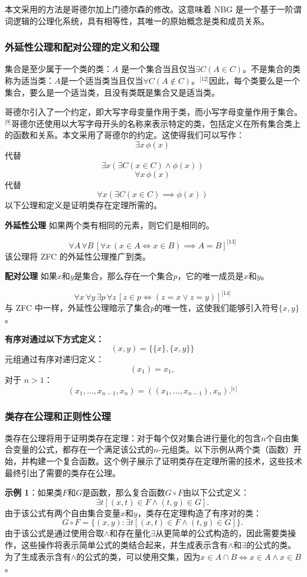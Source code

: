 本文采用的方法是哥德尔加上门德尔森的修改。这意味着 NBG 是一个基于一阶谓词逻辑的公理化系统，具有相等性，其唯一的原始概念是类和成员关系。
\subsubsection{外延性公理和配对公理的定义和公理} 
集合是至少属于一个类的类：\( A \) 是一个集合当且仅当\( \exists C (A \in C) \)。不是集合的类称为适当类：\( A \)是一个适当类当且仅当\( \forall C (A \notin C) \)。\(^\text{[12]}\)因此，每个类要么是一个集合，要么是一个适当类，且没有类既是集合又是适当类。

哥德尔引入了一个约定，即大写字母变量作用于类，而小写字母变量作用于集合。\(^\text{[9]}\)哥德尔还使用以大写字母开头的名称来表示特定的类，包括定义在所有集合类上的函数和关系。本文采用了哥德尔的约定。这使得我们可以写作：
\[
\exists x \, \phi(x)~
\]
代替  
\[
\exists x \left( \exists C (x \in C) \land \phi(x) \right)~
\]
\[
\forall x \, \phi(x)~
\]
代替  
\[
\forall x \left( \exists C (x \in C) \implies \phi(x) \right)~
\]
以下公理和定义是证明类存在定理所需的。

\textbf{外延性公理} 
如果两个类有相同的元素，则它们是相同的。

\[
\forall A \, \forall B \, \left[ \forall x \, (x \in A \iff x \in B) \implies A = B \right]^\text{[13]}~
\] 
该公理将 ZFC 的外延性公理推广到类。

\textbf{配对公理} 
如果\( x \)和\( y \)是集合，那么存在一个集合\( p \)，它的唯一成员是\( x \)和\( y \)。

\[
\forall x \, \forall y \, \exists p \, \forall z \, \left[ z \in p \iff (z = x \lor z = y) \right]^\text{[14]}~
\]
与 ZFC 中一样，外延性公理暗示了集合\( p \)的唯一性，这使我们能够引入符号\( \{x, y\} \)。

\textbf{有序对通过以下方式定义：}
\[
(x, y) = \{\{x\}, \{x, y\}\}~
\]
元组通过有序对递归定义：
\[
(x_1) = x_1,~
\]
对于 \( n > 1 \)：
\[
(x_1, \ldots, x_{n-1}, x_n) = ((x_1, \ldots, x_{n-1}), x_n).^\text{[c]}~
\]  
\subsubsection{类存在公理和正则性公理}  
类存在公理将用于证明类存在定理：对于每个仅对集合进行量化的包含\( n \)个自由集合变量的公式，都存在一个满足该公式的\( n \)-元组类。以下示例从两个类（函数）开始，并构建一个复合函数。这个例子展示了证明类存在定理所需的技术，这些技术最终引出了需要的类存在公理。

\textbf{示例 1}：如果类\( F \)和\( G \)是函数，那么复合函数\( G \circ F \)由以下公式定义：
\[
\exists t \left[ (x,t) \in F \land (t,y) \in G \right].~
\]
由于该公式有两个自由集合变量\( x \)和\( y \)，类存在定理构造了有序对的类：
\[
G \circ F = \{ (x,y) : \exists t \left[ (x,t) \in F \land (t,y) \in G \right] \}.~
\]
由于该公式是通过使用合取\( \land \)和存在量化\( \exists \)从更简单的公式构造的，因此需要类操作，这些操作将表示简单公式的类结合起来，并生成表示含有\( \land \)和\( \exists \)的公式的类。为了生成表示含有\( \land \)的公式的类，可以使用交集，因为\( x \in A \cap B \iff x \in A \land x \in B \)。

